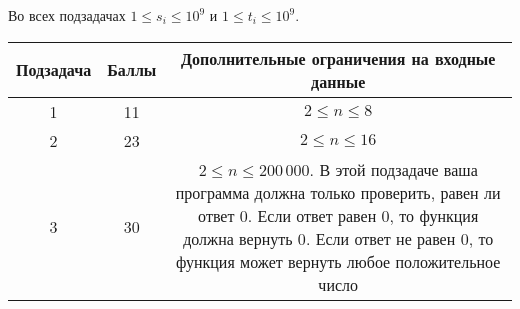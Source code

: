 Во всех подзадачах $1 \le s_i \le 10^9$ и $1 \le t_i \le 10^9$.

\begin{center}
\renewcommand{\arraystretch}{1.5}
\begin{tabular}{|c|c|c|}
\hline
Подзадача & Баллы & Дополнительные ограничения на входные данные\\
\hline
1 & 11 & $2\le n\le 8$ \\
\hline
2 & 23 &  $2\le n\le 16$ \\
\hline
3 & 30 & \parbox{13cm}{\centering \vspace{2mm}$2\le n\le 200\,000$. В этой подзадаче ваша программа должна только проверить, равен ли ответ $0$. Если ответ равен $0$, то функция должна вернуть $0$. Если ответ не равен $0$, то функция может вернуть любое положительное число\\\vspace{2mm}} \\
 & 36 & $2\le n\le 200\,000$ \\
\hline
\end{tabular}
\end{center}
